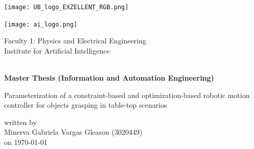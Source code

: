 

\begin{titlepage}

\scshape %
\begin{minipage}{0.6\linewidth}
\texttt{[image: UB\_logo\_EXZELLENT\_RGB.png]}
\end{minipage}
\hfill
\begin{minipage}{0.4\linewidth}
\begin{flushright}
\texttt{[image: ai\_logo.png]}
\end{flushright}
\end{minipage}
\vspace{10pt}
\begin{center}
Faculty 1: Physics and Electrical Engineering  \\
Institute for Artificial Intelligence
\end{center}

\centering
\vspace{-1cm}~~\\

\textbf{\small Master Thesis (Information and Automation Engineering)}\\
\vspace{0.5cm}

\Large   Parameterization of a constraint-based and
optimization-based robotic motion controller for objects grasping in
table-top scenarios
 \\
\vspace{1cm}

\normalsize
\begin{center}
written by \\ Minerva Gabriela Vargas Gleason (3020449) \\on \today  %
\end{center}

\vspace{1cm}


\end{titlepage}
